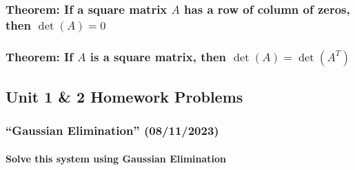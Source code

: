 \documentclass[
  letterpaper,
  DIV=11,
  numbers=noendperiod]{scrartcl}
\let\oldparagraph\paragraph
\renewcommand{\paragraph}[1]{\oldparagraph{#1}\mbox{}}
\begin{document}
\hypertarget{theorem-if-a-square-matrix-a-has-a-row-of-column-of-zeros-then-deta-0}{%
\subsubsection{\texorpdfstring{Theorem: If a square matrix \(A\) has a
row of column of zeros, then
\(\det(A) = 0\)}{Theorem: If a square matrix A has a row of column of zeros, then \textbackslash det(A) = 0}}\label{theorem-if-a-square-matrix-a-has-a-row-of-column-of-zeros-then-deta-0}}

\hypertarget{theorem-if-a-is-a-square-matrix-then-deta-detat}{%
\subsubsection{\texorpdfstring{Theorem: If \(A\) is a square matrix,
then
\(\det(A) = \det(A^T)\)}{Theorem: If A is a square matrix, then \textbackslash det(A) = \textbackslash det(A\^{}T)}}\label{theorem-if-a-is-a-square-matrix-then-deta-detat}}

\newpage{}

\hypertarget{unit-1-2-homework-problems}{%
\subsection{Unit 1 \& 2 Homework
Problems}\label{unit-1-2-homework-problems}}

\hypertarget{gaussian-elimination-08112023}{%
\subsubsection{``Gaussian Elimination''
(08/11/2023)}\label{gaussian-elimination-08112023}}

\hypertarget{solve-this-system-using-gaussian-elimination}{%
\paragraph{Solve this system using Gaussian
Elimination}\label{solve-this-system-using-gaussian-elimination}}

\end{document}
